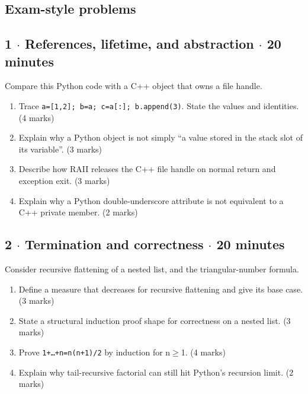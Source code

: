 \documentclass[11pt]{article}
\begin{document}
\begin{keepsection}
\section{Exam-style problems}

\begin{keepsection}
\subsection{1 \ensuremath{\cdot} References, lifetime, and abstraction \ensuremath{\cdot} 20 minutes}

Compare this Python code with a C++ object that owns a file handle.

\begin{enumerate}
\item Trace \texttt{a=[1,2]; b=a; c=a[:]; b.append(3)}. State the values and identities. (4 marks)
\item Explain why a Python object is not simply “a value stored in the stack slot of its variable”. (3 marks)
\item Describe how RAII releases the C++ file handle on normal return and exception exit. (3 marks)
\item Explain why a Python double-underscore attribute is not equivalent to a C++ private member. (2 marks)
\end{enumerate}

\end{keepsection}

\begin{keepsection}
\subsection{2 \ensuremath{\cdot} Termination and correctness \ensuremath{\cdot} 20 minutes}

Consider recursive flattening of a nested list, and the triangular-number formula.

\begin{enumerate}
\item Define a measure that decreases for recursive flattening and give its base case. (3 marks)
\item State a structural induction proof shape for correctness on a nested list. (3 marks)
\item Prove \texttt{1+…+n=n(n+1)/2} by induction for n\ensuremath{\geq}1. (4 marks)
\item Explain why tail-recursive factorial can still hit Python’s recursion limit. (2 marks)
\end{enumerate}

\end{keepsection}
\end{keepsection}
\end{document}
